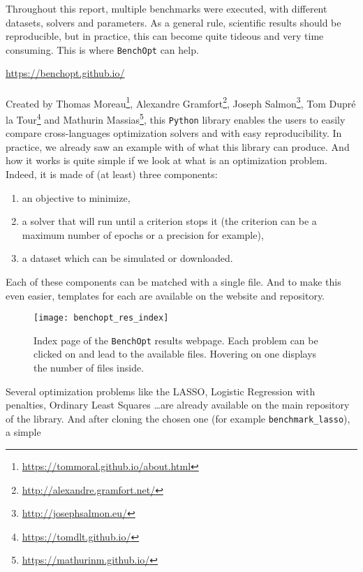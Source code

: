 \documentclass[../main.tex]{subfiles}
\begin{document}
Throughout this report, multiple benchmarks were executed, with different
datasets, solvers and parameters. As a general rule, scientific results should
be reproducible, but in practice, this can become quite tideous and very time
consuming. This is where \texttt{BenchOpt} can help.
\begin{center}
    \url{https://benchopt.github.io/}
\end{center}
%
\paragraph*{}
%
Created by Thomas Moreau\footnote{\url{https://tommoral.github.io/about.html}},
Alexandre Gramfort\footnote{\url{http://alexandre.gramfort.net/}},
Joseph Salmon\footnote{\url{http://josephsalmon.eu/}},
Tom Dupré la Tour\footnote{\url{https://tomdlt.github.io/}}
and Mathurin Massias\footnote{\url{https://mathurinm.github.io/}},
this \texttt{Python} library enables the users to easily compare cross-languages
optimization solvers and with easy reproducibility.
In practice, we already saw an example with  of what this
library can produce.
And how it works is quite simple if we look at what is an optimization problem.
Indeed, it is made of (at least) three components:
\begin{enumerate}[label=$\bullet$]
    \item an objective to minimize,
    \item a solver that will run until a criterion stops it (the criterion can
    be a maximum number of epochs or a precision for example),
    \item a dataset which can be simulated or downloaded.
\end{enumerate}
Each of these components can be matched with a single file.
And to make this even easier, templates for each are available on the
website and repository.
\begin{figure}[h!]
    \centering
    \texttt{[image: benchopt\_res\_index]}
    \caption{Index page of the \texttt{BenchOpt} results webpage.
    Each problem can be clicked on and lead to the available files.
    Hovering on one displays the number of files inside.}
    \label{fig:index_results}
\end{figure}
Several optimization problems like the LASSO, Logistic Regression with penalties,
Ordinary Least Squares \dots are already available on the main repository of the
library.
And after cloning the chosen one (for example \texttt{benchmark\_lasso}), a simple
\end{document}
